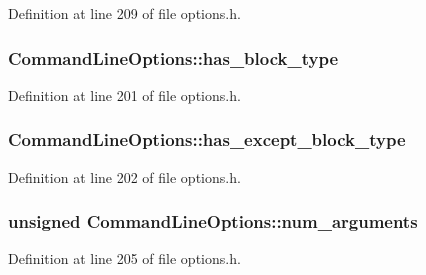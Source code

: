Definition at line 209 of file options.\+h.

\subsubsection[{\texorpdfstring{has\+\_\+block\+\_\+type}{has_block_type}}]{ Command\+Line\+Options\+::has\+\_\+block\+\_\+type}\hypertarget{struct_command_line_options_a23896f20dd4c160aff71c58db40ce110}{}\label{struct_command_line_options_a23896f20dd4c160aff71c58db40ce110}


Definition at line 201 of file options.\+h.

\subsubsection[{\texorpdfstring{has\+\_\+except\+\_\+block\+\_\+type}{has_except_block_type}}]{ Command\+Line\+Options\+::has\+\_\+except\+\_\+block\+\_\+type}\hypertarget{struct_command_line_options_ae6a6ab20262e859a4335968e67adf6f7}{}\label{struct_command_line_options_ae6a6ab20262e859a4335968e67adf6f7}


Definition at line 202 of file options.\+h.

\subsubsection[{\texorpdfstring{num\+\_\+arguments}{num_arguments}}]{\setlength{\rightskip}{0pt plus 5cm}unsigned Command\+Line\+Options\+::num\+\_\+arguments}\hypertarget{struct_command_line_options_ac5b9fd0f965a9e2a786c23ee75984d5f}{}\label{struct_command_line_options_ac5b9fd0f965a9e2a786c23ee75984d5f}


Definition at line 205 of file options.\+h.

